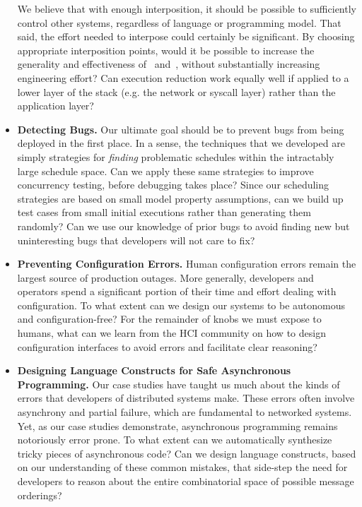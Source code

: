 \begin{itemize}
We believe that with enough interposition, it should be possible to
sufficiently control other systems, regardless of language or
programming model. That said, the effort needed to interpose could certainly be
significant. By choosing appropriate interposition points, would it be
possible to increase the generality and effectiveness of
\projectname~and~\sys, without substantially increasing engineering effort?
Can execution reduction work equally well if applied to a lower layer of the
stack (e.g.
the network or syscall layer) rather than the application layer?

\item \textbf{Detecting Bugs.} Our ultimate goal should be to prevent bugs
from being deployed in the first place. In a sense, the techniques
that we developed are simply strategies for \textit{finding}
problematic schedules
within the intractably large schedule space. Can we apply these same
strategies to improve concurrency testing, before debugging takes place? Since our
scheduling strategies are based on small model property assumptions, can we build
up test cases from small initial executions rather than generating them randomly?
Can we use our knowledge of prior bugs to avoid finding new but uninteresting bugs that
developers will not care to fix?

\item \textbf{Preventing Configuration Errors.} Human configuration errors
remain the largest source of production outages.
More generally, developers and operators spend a significant portion of their time and effort dealing with configuration.
To what extent can we design our systems to be autonomous and configuration-free? For the remainder of knobs we must
expose to humans, what can we learn from the HCI community on how to design configuration interfaces to avoid errors and facilitate clear reasoning?

\item \textbf{Designing Language Constructs for Safe Asynchronous
Programming.} Our case studies have taught us much about the kinds of errors
that developers of distributed systems make. These errors often involve
asynchrony and partial failure, which  are fundamental to networked systems.
Yet, as our case studies demonstrate, asynchronous programming remains
notoriously error prone. To what extent can we automatically synthesize tricky
pieces of asynchronous code? Can we design language constructs, based on our
understanding of these common mistakes, that side-step the need for developers to reason about the entire combinatorial space of possible message orderings?

\end{itemize}

